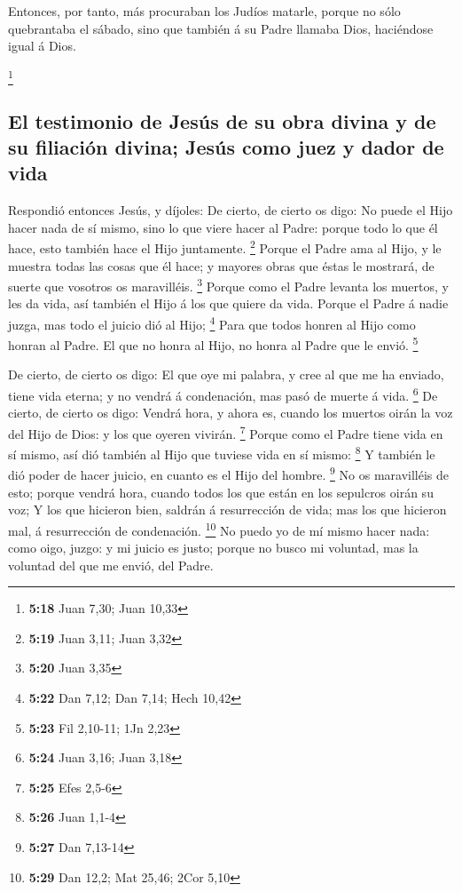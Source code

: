  Entonces, por tanto, más procuraban los Judíos matarle,
porque no sólo quebrantaba el sábado, sino que también á su Padre
llamaba Dios, haciéndose igual á Dios.

\footnote{\textbf{5:18} Juan 7,30; Juan 10,33}

\hypertarget{el-testimonio-de-jesuxfas-de-su-obra-divina-y-de-su-filiaciuxf3n-divina-jesuxfas-como-juez-y-dador-de-vida}{%
\subsection{El testimonio de Jesús de su obra divina y de su filiación
divina; Jesús como juez y dador de
vida}\label{el-testimonio-de-jesuxfas-de-su-obra-divina-y-de-su-filiaciuxf3n-divina-jesuxfas-como-juez-y-dador-de-vida}}

 Respondió entonces Jesús, y díjoles: De cierto, de cierto
os digo: No puede el Hijo hacer nada de sí mismo, sino lo que viere
hacer al Padre: porque todo lo que él hace, esto también hace el Hijo
juntamente. \footnote{\textbf{5:19} Juan 3,11; Juan 3,32} 
Porque el Padre ama al Hijo, y le muestra todas las cosas que él hace; y
mayores obras que éstas le mostrará, de suerte que vosotros os
maravilléis. \footnote{\textbf{5:20} Juan 3,35}  Porque
como el Padre levanta los muertos, y les da vida, así también el Hijo á
los que quiere da vida.  Porque el Padre á nadie juzga, mas
todo el juicio dió al Hijo; \footnote{\textbf{5:22} Dan 7,12; Dan 7,14;
  Hech 10,42}  Para que todos honren al Hijo como honran al
Padre. El que no honra al Hijo, no honra al Padre que le envió.
\footnote{\textbf{5:23} Fil 2,10-11; 1Jn 2,23}

 De cierto, de cierto os digo: El que oye mi palabra, y
cree al que me ha enviado, tiene vida eterna; y no vendrá á condenación,
mas pasó de muerte á vida. \footnote{\textbf{5:24} Juan 3,16; Juan 3,18}
 De cierto, de cierto os digo: Vendrá hora, y ahora es,
cuando los muertos oirán la voz del Hijo de Dios: y los que oyeren
vivirán. \footnote{\textbf{5:25} Efes 2,5-6}  Porque como
el Padre tiene vida en sí mismo, así dió también al Hijo que tuviese
vida en sí mismo: \footnote{\textbf{5:26} Juan 1,1-4}  Y
también le dió poder de hacer juicio, en cuanto es el Hijo del hombre.
\footnote{\textbf{5:27} Dan 7,13-14}  No os maravilléis de
esto; porque vendrá hora, cuando todos los que están en los sepulcros
oirán su voz;  Y los que hicieron bien, saldrán á
resurrección de vida; mas los que hicieron mal, á resurrección de
condenación. \footnote{\textbf{5:29} Dan 12,2; Mat 25,46; 2Cor 5,10}
 No puedo yo de mí mismo hacer nada: como oigo, juzgo: y mi
juicio es justo; porque no busco mi voluntad, mas la voluntad del que me
envió, del Padre.

